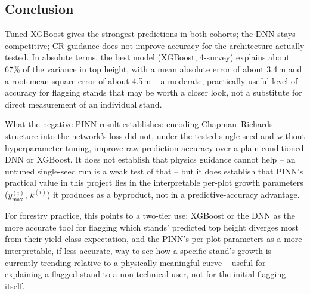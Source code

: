 \documentclass[logo,msc,ai]{infthesis}           %
\begin{document}
\subsection*{Conclusion}
Tuned XGBoost gives the strongest predictions in both cohorts; the DNN stays competitive; CR guidance does not improve accuracy for the architecture actually tested. In absolute terms, the best model (XGBoost, 4-survey) explains about 67\% of the variance in top height, with a mean absolute error of about 3.4\,m and a root-mean-square error of about 4.5\,m -- a moderate, practically useful level of accuracy for flagging stands that may be worth a closer look, not a substitute for direct measurement of an individual stand.

What the negative PINN result establishes: encoding Chapman--Richards structure into the network's loss did not, under the tested single seed and without hyperparameter tuning, improve raw prediction accuracy over a plain conditioned DNN or XGBoost. It does not establish that physics guidance cannot help -- an untuned single-seed run is a weak test of that -- but it does establish that PINN's practical value in this project lies in the interpretable per-plot growth parameters ($y_{\max}^{(i)}$, $k^{(i)}$) it produces as a byproduct, not in a predictive-accuracy advantage.

For forestry practice, this points to a two-tier use: XGBoost or the DNN as the more accurate tool for flagging which stands' predicted top height diverges most from their yield-class expectation, and the PINN's per-plot parameters as a more interpretable, if less accurate, way to see how a specific stand's growth is currently trending relative to a physically meaningful curve -- useful for explaining a flagged stand to a non-technical user, not for the initial flagging itself.





\end{document}
